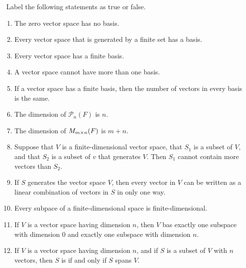 \exercisesection

\begin{exercise} \label{exercise 1.6.1}\ 
Label the following statements as true or false.
\begin{enumerate}
\item The zero vector space has no basis.
\item Every vector space that is generated by a finite set has a basis.
\item Every vector space has a finite basis.
\item A vector space cannot have more than one basis.
\item If a vector space has a finite basis, then the number of vectors in every basis is the same.
\item The dimension of \(\mathcal{P}_n(F)\) is \(n\).
\item The dimension of \(M_{m \times n}(F)\) is \(m + n\).
\item Suppose that \(V\) is a finite-dimensional vector space, that \(S_1\) is a \LID{} subset of \(V\), and that \(S_2\) is a subset of \(v\) that
generates \(V\).
    Then \(S_1\) cannot contain more vectors than \(S_2\).
\item If \(S\) generates the vector space \(V\), then every vector in \(V\) can be written as a linear combination of vectors in \(S\) in only one way. 
\item Every subpace of a finite-dimensional space is finite-dimensional.
\item If \(V\) is a vector space having dimension \(n\), then \(V\) bas exactly one subspace with dimension \(0\) and exactly one subspace with dimension \(n\).
\item If \(V\) is a vector space having dimension \(n\), and if \(S\) is a subset of \(V\) with \(n\) vectors, then \(S\) is \LID{} if and only if \(S\)
spans \(V\).
\end{enumerate}
\end{exercise}

